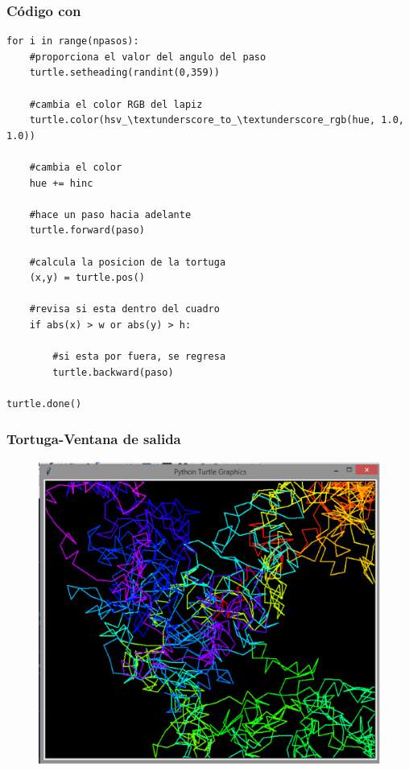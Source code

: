 \begin{frame}
\frametitle{Código con \python}
\begin{lstlisting}[caption=Definición de pasos y dirección, style=FormattedNumber, basicstyle=\linespread{1.1}\ttfamily=\small, columns=fullflexible]
for i in range(npasos):
	#proporciona el valor del angulo del paso
    turtle.setheading(randint(0,359))
    
    #cambia el color RGB del lapiz
    turtle.color(hsv_\textunderscore_to_\textunderscore_rgb(hue, 1.0, 1.0))
    
    #cambia el color
    hue += hinc
    
    #hace un paso hacia adelante
    turtle.forward(paso)
    
    #calcula la posicion de la tortuga
    (x,y) = turtle.pos()
    
    #revisa si esta dentro del cuadro
    if abs(x) > w or abs(y) > h:
    	
    	#si esta por fuera, se regresa
        turtle.backward(paso)
        
turtle.done()
\end{lstlisting}
\end{frame}
\begin{frame}
\frametitle{Tortuga-Ventana de salida}
\begin{figure}
	\centering
	\includegraphics[scale=0.3]{Imagenes/caminataAleatoria_Python_01.eps}
\end{figure}
\end{frame}
